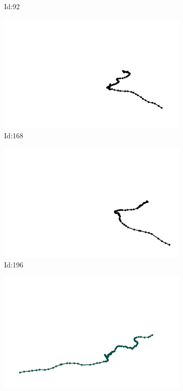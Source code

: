 \documentclass[12pt,twoside]{report}
\begin{document}
\begin{figure}
\begin{subfigure}[b]{0.20\textwidth}
\caption{Id:92}
\end{subfigure}
\begin{subfigure}[b]{0.20\textwidth}
\centering
\includegraphics[width=\textwidth]{../trajectories/168.png}
\caption{Id:168}
\end{subfigure}
\begin{subfigure}[b]{0.20\textwidth}
\centering
\includegraphics[width=\textwidth]{../trajectories/196.png}
\caption{Id:196}
\end{subfigure}
\begin{subfigure}[b]{0.20\textwidth}
\centering
\includegraphics[width=\textwidth]{../trajectories/199.png}

\end{subfigure}
\end{figure}
\end{document}
